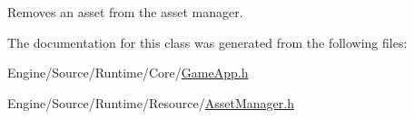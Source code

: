 Removes an asset from the asset manager. 

The documentation for this class was generated from the following files\+:\begin{DoxyCompactItemize}
\item 
Engine/\+Source/\+Runtime/\+Core/\mbox{\hyperlink{_game_app_8h}{Game\+App.\+h}}\item 
Engine/\+Source/\+Runtime/\+Resource/\mbox{\hyperlink{_asset_manager_8h}{Asset\+Manager.\+h}}\end{DoxyCompactItemize}
